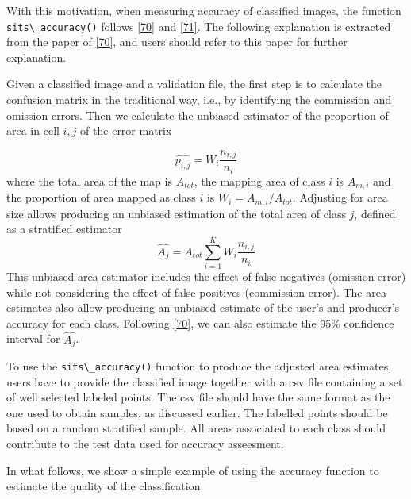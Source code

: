 \documentclass[
  11pt,
]{report}
\newcommand{\passthrough}[1]{#1}
\begin{document}
With this motivation, when measuring accuracy of classified images, the
function \passthrough{\lstinline!sits\_accuracy()!} follows
\protect\hyperlink{ref-Olofsson2013}{{[}70{]}} and
\protect\hyperlink{ref-Olofsson2014}{{[}71{]}}. The following
explanation is extracted from the paper of
\protect\hyperlink{ref-Olofsson2013}{{[}70{]}}, and users should refer
to this paper for further explanation.

Given a classified image and a validation file, the first step is to
calculate the confusion matrix in the traditional way, i.e., by
identifying the commission and omission errors. Then we calculate the
unbiased estimator of the proportion of area in cell \(i,j\) of the
error matrix

\[
\hat{p_{i,j}} = W_i\frac{n_{i,j}}{n_i}
\] where the total area of the map is \(A_{tot}\), the mapping area of
class \(i\) is \(A_{m,i}\) and the proportion of area mapped as class
\(i\) is \(W_i = {A_{m,i}}/{A_{tot}}\). Adjusting for area size allows
producing an unbiased estimation of the total area of class \(j\),
defined as a stratified estimator \[
\hat{A_j} = A_{tot}\sum_{i=1}^KW_i\frac{n_{i,j}}{n_i}
\] This unbiased area estimator includes the effect of false negatives
(omission error) while not considering the effect of false positives
(commission error). The area estimates also allow producing an unbiased
estimate of the user's and producer's accuracy for each class. Following
\protect\hyperlink{ref-Olofsson2013}{{[}70{]}}, we can also estimate the
95\% confidence interval for \(\hat{A_j}\).

To use the \passthrough{\lstinline!sits\_accuracy()!} function to
produce the adjusted area estimates, users have to provide the
classified image together with a csv file containing a set of well
selected labeled points. The csv file should have the same format as the
one used to obtain samples, as discussed earlier. The labelled points
should be based on a random stratified sample. All areas associated to
each class should contribute to the test data used for accuracy
asseesment.

In what follows, we show a simple example of using the accuracy function
to estimate the quality of the classification
\end{document}
